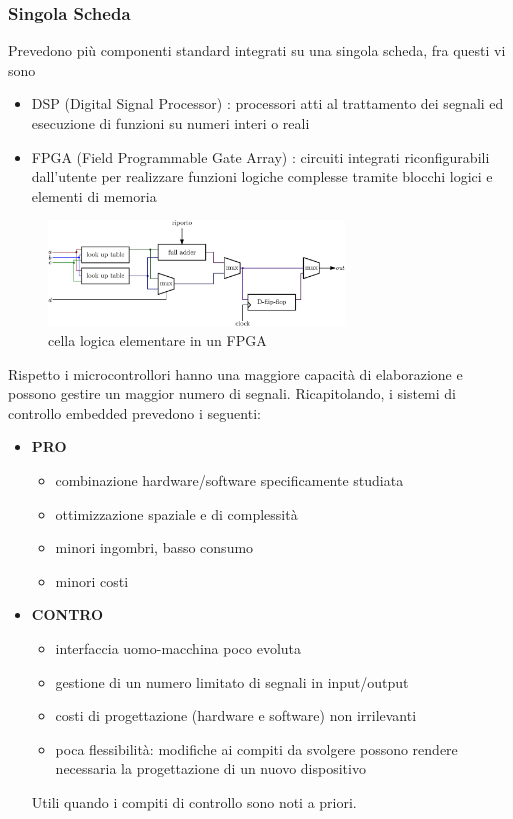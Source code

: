 \documentclass[10pt, letterpaper]{report}
\begin{document}
\subsubsection{Singola Scheda}
Prevedono più componenti standard integrati su una singola scheda, fra questi vi sono\begin{itemize}
    \item DSP (Digital Signal Processor) : processori atti al trattamento dei segnali ed esecuzione di funzioni su numeri interi o reali 
    \item FPGA (Field Programmable Gate Array) : circuiti integrati riconfigurabili dall’utente per realizzare 
    funzioni logiche complesse tramite blocchi logici e elementi di memoria
\end{itemize}
\begin{figure}[h!]
    \centering
    \includegraphics[width=0.7\textwidth ]{images/cellaLogica.eps}
    \caption{cella logica elementare in un FPGA}
\end{figure}
Rispetto i microcontrollori hanno una maggiore capacità di elaborazione e possono gestire un maggior numero 
di segnali.\acc 
Ricapitolando, i sistemi di controllo embedded prevedono i seguenti:\begin{itemize}
    \item \textbf{PRO}\begin{itemize}
        \item combinazione hardware/software specificamente studiata 
        \item ottimizzazione spaziale e di complessità
        \item minori ingombri, basso consumo 
        \item minori costi
    \end{itemize}
    \item \textbf{CONTRO}\begin{itemize}
        \item interfaccia uomo-macchina poco evoluta
        \item  gestione di un numero limitato di segnali in input/output 
        \item  costi di progettazione (hardware e software) non irrilevanti 
        \item poca flessibilità: modifiche ai compiti da svolgere possono 
        rendere necessaria la progettazione di un nuovo dispositivo 
    \end{itemize}
    Utili quando i compiti di controllo sono noti a priori.
\end{itemize}
\end{document}
